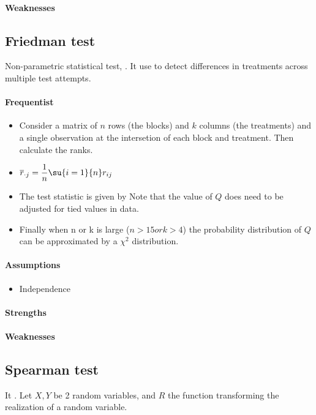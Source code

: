 \paragraph{Weaknesses}

\subsection{Friedman test}
Non-parametric statistical test, .
It use to detect differences in treatments across multiple test attempts.
\paragraph{Frequentist}
\begin{itemize}
    \item Consider a matrix of $n$ rows (the blocks) and $k$ columns (the treatments)
    and a single observation at the intersetion of each block and treatment. Then 
    calculate the ranks.
    \item $\overline{r}_{\cdot j} = \dfrac{1}{n}\su{i=1}{n}r_{ij}$
    \item The test statistic is given by 
    Note that the value of $Q$ does need to be adjusted for tied values in data.
    \item Finally when n or k is large ($n>15 or k>4$) the probability distribution of $Q$ can be approximated by
    a $\chi^{2}$ distribution.
\end{itemize}

\paragraph{Assumptions}
\begin{itemize}
    \item Independence
\end{itemize}
\paragraph{Strengths}
\paragraph{Weaknesses}

\subsection{Spearman test}
It .
Let $X, Y$ be 2 random variables, and $R$ the function transforming the realization of a random variable.

